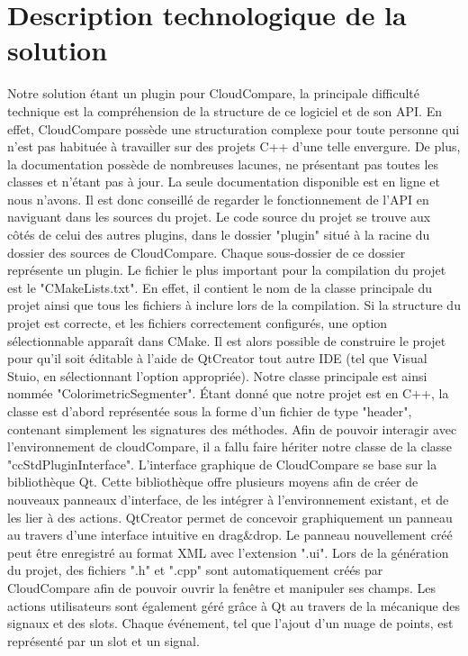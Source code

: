 \documentclass[12pt,titlepage,french]{article}
\begin{document}
\section{Description technologique de la solution}
Notre solution étant un plugin pour CloudCompare, la principale difficulté technique est la compréhension de la structure de ce logiciel et de son API.
En effet, CloudCompare possède une structuration complexe pour toute personne qui n'est pas habituée à travailler sur des projets C++ d'une telle envergure.
De plus, la documentation possède de nombreuses lacunes, ne présentant pas toutes les classes et n'étant pas à jour. La seule documentation disponible est en ligne et nous n'avons.
Il est donc conseillé de regarder le fonctionnement de l'API en naviguant dans les sources du projet.
Le code source du projet se trouve aux côtés de celui des autres plugins, dans le dossier "plugin" situé à la racine du dossier des sources de CloudCompare.
Chaque sous-dossier de ce dossier représente un plugin.\newline
Le fichier le plus important pour la compilation du projet est le "CMakeLists.txt". En effet, il contient le nom de la classe principale du projet ainsi que tous les fichiers à inclure lors de la compilation.
Si la structure du projet est correcte, et les fichiers correctement configurés, une option sélectionnable apparaît dans CMake.
Il est alors possible de construire le projet pour qu'il soit éditable à l'aide de QtCreator tout autre IDE (tel que Visual Stuio, en sélectionnant l'option appropriée).
Notre classe principale est ainsi nommée "ColorimetricSegmenter". Étant donné que notre projet est en C++, la classe est d'abord représentée sous la forme d'un fichier de type "header", contenant simplement les signatures des méthodes.
Afin de pouvoir interagir avec l'environnement de cloudCompare, il a fallu faire hériter notre classe de la classe "ccStdPluginInterface".\newline
L'interface graphique de CloudCompare se base sur la bibliothèque Qt. Cette bibliothèque offre plusieurs moyens afin de créer de nouveaux panneaux d'interface, de les intégrer à l'environnement existant, et de les lier à des actions.
QtCreator permet de concevoir graphiquement un panneau au travers d'une interface intuitive en drag\&drop. Le panneau nouvellement créé peut être enregistré au format XML avec l'extension ".ui".
Lors de la génération du projet, des fichiers ".h" et ".cpp" sont automatiquement créés par CloudCompare afin de pouvoir ouvrir la fenêtre  et manipuler ses champs.\newline
Les actions utilisateurs sont également géré grâce à Qt au travers de la mécanique des signaux et des slots. Chaque événement, tel que l'ajout d'un nuage de points, est représenté par un slot et un signal.
\end{document}
